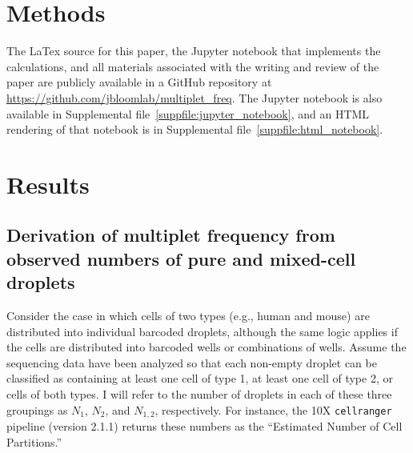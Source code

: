 \documentclass[fleqn,10pt]{wlpeerj} %
\begin{document}
\section*{Methods}
The LaTex source for this paper, the Jupyter notebook that implements the calculations, and all materials associated with the writing and review of the paper are publicly available in a GitHub repository at \url{https://github.com/jbloomlab/multiplet_freq}.
The Jupyter notebook is also available in Supplemental file~\ref{suppfile:jupyter_notebook}, and an HTML rendering of that notebook is in Supplemental file~\ref{suppfile:html_notebook}.

\section*{Results}
\label{sec:results}

\subsection*{Derivation of multiplet frequency from observed numbers of pure and mixed-cell droplets}
Consider the case in which cells of two types (e.g., human and mouse) are distributed into individual barcoded droplets, although the same logic applies if the cells are distributed into barcoded wells or combinations of wells.
Assume the sequencing data have been analyzed so that each non-empty droplet can be classified as containing at least one cell of type 1, at least one cell of type 2, or cells of both types.
I will refer to the number of droplets in each of these three groupings as $N_1$, $N_2$, and $N_{1,2}$, respectively.
For instance, the 10X \texttt{cellranger} pipeline (version 2.1.1) returns these numbers as the ``Estimated Number of Cell Partitions.''
\end{document}
